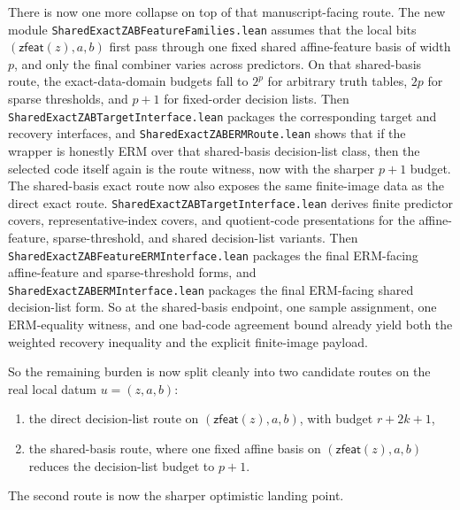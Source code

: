 \documentclass[11pt]{article}
\theoremstyle{remark}
\begin{document}
There is now one more collapse on top of that manuscript-facing route.  The new
module \texttt{SharedExactZABFeatureFamilies.lean} assumes that the local bits
\((\mathsf{zfeat}(z),a,b)\) first pass through one fixed shared affine-feature
basis of width \(p\), and only the final combiner varies across predictors.  On
that shared-basis route, the exact-data-domain budgets fall to \(2^p\) for arbitrary
truth tables, \(2p\) for sparse thresholds, and \(p+1\) for fixed-order
decision lists.  Then \texttt{SharedExactZABTargetInterface.lean} packages the
corresponding target and recovery interfaces, and
\texttt{SharedExactZABERMRoute.lean} shows that if the wrapper is honestly ERM
over that shared-basis decision-list class, then the selected code itself again
is the route witness, now with the sharper \(p+1\) budget.  The shared-basis
exact route now also exposes the same finite-image data as the direct exact
route.  \texttt{SharedExactZABTargetInterface.lean} derives finite predictor
covers, representative-index covers, and quotient-code presentations for the
affine-feature, sparse-threshold, and shared decision-list variants.  Then
\texttt{SharedExactZABFeatureERMInterface.lean} packages the final ERM-facing
affine-feature and sparse-threshold forms, and
\texttt{SharedExactZABERMInterface.lean} packages the final ERM-facing shared
decision-list form.  So at the shared-basis endpoint, one sample assignment,
one ERM-equality witness, and one bad-code agreement bound already yield both
the weighted recovery inequality and the explicit finite-image payload.

So the remaining burden is now split cleanly into two candidate routes on the
real local datum \(u=(z,a,b)\):
\begin{enumerate}[leftmargin=1.5em]
  \item the direct decision-list route on \((\mathsf{zfeat}(z),a,b)\), with budget \(r+2k+1\),
  \item the shared-basis route, where one fixed affine basis on \((\mathsf{zfeat}(z),a,b)\) reduces the decision-list budget to \(p+1\).
\end{enumerate}
The second route is now the sharper optimistic landing point.
\end{document}

